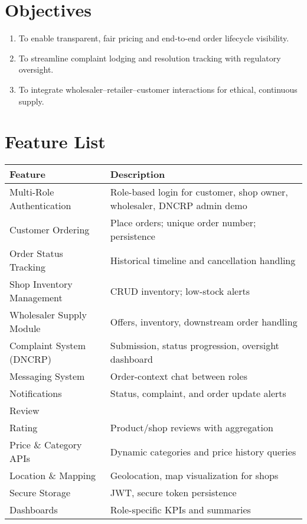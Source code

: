 \documentclass[12pt,a4paper]{article}
\begin{document}
\section{Objectives}
\begin{enumerate}
  \item To enable transparent, fair pricing and end-to-end order lifecycle visibility.
  \item To streamline complaint lodging and resolution tracking with regulatory oversight.
  \item To integrate wholesaler--retailer--customer interactions for ethical, continuous supply.
\end{enumerate}

\section{Feature List}
\begin{longtable}{p{4cm} p{10cm}}
\toprule
\textbf{Feature} & \textbf{Description} \\
\midrule
Multi-Role Authentication & Role-based login for customer, shop owner, wholesaler, DNCRP admin demo \\
Customer Ordering & Place orders; unique order number; persistence \\
Order Status Tracking & Historical timeline and cancellation handling \\
Shop Inventory Management & CRUD inventory; low-stock alerts \\
Wholesaler Supply Module & Offers, inventory, downstream order handling \\
Complaint System (DNCRP) & Submission, status progression, oversight dashboard \\
Messaging System & Order-context chat between roles \\
Notifications & Status, complaint, and order update alerts \\
Review \\ Rating & Product/shop reviews with aggregation \\
Price \& Category APIs & Dynamic categories and price history queries \\
Location \& Mapping & Geolocation, map visualization for shops \\
Secure Storage & JWT, secure token persistence \\
Dashboards & Role-specific KPIs and summaries \\
\bottomrule
\end{longtable}
\end{document}
